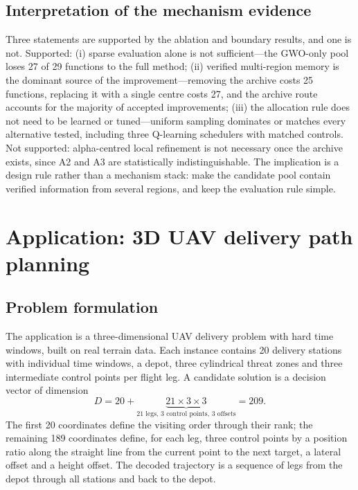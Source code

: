 \documentclass[11pt,a4paper]{article}
\begin{document}
\begin{table}[t]
\centering
\small
\caption{Design-space boundary experiments. Each hypothesis was tested with a
matched control under the common protocol; ratios below one favour the control
variant and ratios above one favour the reference configuration.}
\label{tab:bound}
\resizebox{\linewidth}{!}{}
\end{table}

\subsection{Interpretation of the mechanism evidence}
Three statements are supported by the ablation and boundary results, and one
is not. Supported: (i) sparse evaluation alone is not sufficient---the
GWO-only pool loses 27 of 29 functions to the full method; (ii) verified
multi-region memory is the dominant source of the improvement---removing the
archive costs 25 functions, replacing it with a single centre costs 27, and
the archive route accounts for the majority of accepted improvements; (iii)
the allocation rule does not need to be learned or tuned---uniform sampling
dominates or matches every alternative tested, including three Q-learning
schedulers with matched controls. Not supported: alpha-centred local
refinement is not necessary once the archive exists, since A2 and A3 are
statistically indistinguishable. The implication is a design rule rather than
a mechanism stack: make the candidate pool contain verified information from
several regions, and keep the evaluation rule simple.

\section{Application: 3D UAV delivery path planning}
\label{sec:uav}
\subsection{Problem formulation}
The application is a three-dimensional UAV delivery problem with hard time
windows, built on real terrain data. Each instance contains 20 delivery
stations with individual time windows, a depot, three cylindrical threat zones
and three intermediate control points per flight leg. A candidate solution is
a decision vector of dimension
\begin{equation}
D=20+\underbrace{21\times3\times3}_{\text{21 legs, 3 control points, 3 offsets}}
=209 .
\end{equation}
The first 20 coordinates define the visiting order through their rank; the
remaining 189 coordinates define, for each leg, three control points by a
position ratio along the straight line from the current point to the next
target, a lateral offset and a height offset. The decoded trajectory is a
sequence of legs from the depot through all stations and back to the depot.
\end{document}
